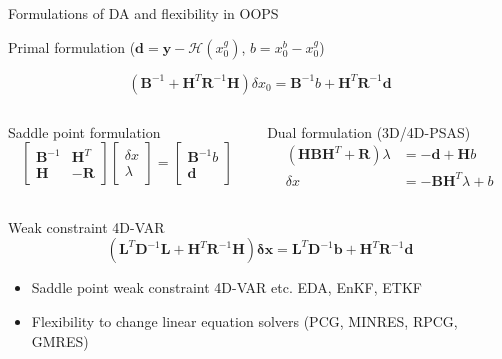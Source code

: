 \documentclass[9pt]{beamer}
\newcommand{\op}[1]{\mathrm{\mathbf{#1}}}
\renewcommand{\vec}[1]{\mathrm{\mathbf{#1}}}
\begin{document}



\begin{frame}{Formulations of DA and flexibility in OOPS}
  \begin{block}{Primal formulation ($\vec{d}= \vec{y} - \mathcal{H}(x_0^g)$, $b = x_0^b-x_0^g$)}

$$(\op{B}^{-1} + \op{H}^T \op{R}^{-1} \op{H} ) \delta x_0  = \op{B}^{-1}b + \op{H}^T \op{R}^{-1} \vec{d}$$
\end{block}

\pause
\begin{columns}
\begin{column}{0.45\linewidth}
\begin{block}{Saddle point formulation }
  $$ \begin{bmatrix} \op{B}^{-1} & \op{H}^T \\ \op{H} & -\op{R} \end{bmatrix} \begin{bmatrix}{\delta x} \\ \lambda \end{bmatrix} = \begin{bmatrix} \op{B}^{-1} b \\ \vec{d}  \end{bmatrix}$$ 
\end{block}
\end{column} 
\begin{column}{0.45\linewidth}
\begin{block}{Dual formulation (3D/4D-PSAS) }
$$\begin{aligned} 
  (\op{H}\op{B}\op{H}^T   + \op{R}) \lambda &= -\vec{d} + \op{H} b      \\
                           {\delta x} &= - \op{B} \op{H}^T \lambda  + b
\end{aligned}$$
\end{block}
\end{column}
\end{columns}
\pause
\begin{block}{Weak constraint 4D-VAR}
  $$ (\op{L}^T \op{D}^{-1} \op{L} + \op{H}^T \op{R}^{-1} \op{H} ) \vec{\delta x} = \op{L}^T \op{D}^{-1} \vec{b} + \op{H}^T \op{R}^{-1} \vec{d}$$
\end{block}

\begin{itemize}
  \item Saddle point weak constraint 4D-VAR etc. EDA, EnKF, ETKF
  \item Flexibility to change linear equation solvers (PCG, MINRES, RPCG, GMRES)
\end{itemize}
\end{frame}
\end{document}
